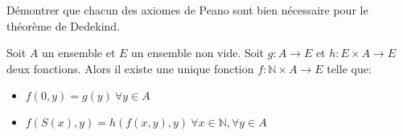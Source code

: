 \begin{exercice}
	Démontrer que chacun des axiomes de Peano sont bien nécessaire pour le théorème de Dedekind.
\end{exercice}



\begin{coro}
	Soit $A$ un ensemble et $E$ un ensemble non vide. Soit $g: A \to E$ et $h: E \times A \to E$ deux fonctions. Alors il existe une unique fonction $f: \mathbb{N} \times A \to E$ telle que:
	\begin{itemize}
		\item $f(0,y) = g(y) \ \forall y \in A$
		\item $f(S(x), y) = h(f(x,y), y) \ \forall x \in \mathbb{N}, \forall y \in A$
	\end{itemize}
\end{coro}


